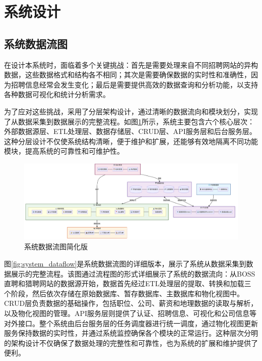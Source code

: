 \section{系统设计}

\subsection{系统数据流图}

在设计本系统时，面临着多个关键挑战：首先是需要处理来自不同招聘网站的异构数据，这些数据格式和结构各不相同；其次是需要确保数据的实时性和准确性，因为招聘信息经常会发生变化；最后是需要提供高效的数据查询和分析功能，以支持各种数据可视化和统计分析需求。

为了应对这些挑战，采用了分层架构设计，通过清晰的数据流向和模块划分，实现了从数据采集到数据展示的完整流程。如图\ref{fig:system_dataflow_simplified}所示，系统主要包含六个核心层次：外部数据源层、ETL处理层、数据存储层、CRUD层、API服务层和后台服务层。这种分层设计不仅使系统结构清晰，便于维护和扩展，还能够有效地隔离不同功能模块，提高系统的可靠性和可维护性。

\begin{figure}[htbp]
    \centering
    \includegraphics[width=1.0\textwidth]{figures/系统数据流图简化版.png}
    \caption{系统数据流图简化版}
    \label{fig:system_dataflow_simplified}
\end{figure}



图\ref{fig:system_dataflow}是系统数据流图的详细版本，展示了系统从数据采集到数据展示的完整流程。该图通过流程图的形式详细展示了系统的数据流向：从BOSS直聘和猎聘网站的数据源开始，数据首先经过ETL处理层的提取、转换和加载三个阶段，然后依次存储在原始数据库、暂存数据库、主数据库和物化视图中。CRUD层负责数据的基础操作，包括职位、公司、薪资和地理数据的读取与解析，以及物化视图的管理。API服务层则提供了认证、招聘信息、可视化和公司信息等对外接口。整个系统由后台服务层的任务调度器进行统一调度，通过物化视图更新服务保持数据的实时性，并通过系统监控确保各个模块的正常运行。这种层次分明的架构设计不仅确保了数据处理的完整性和可靠性，也为系统的扩展和维护提供了便利。

